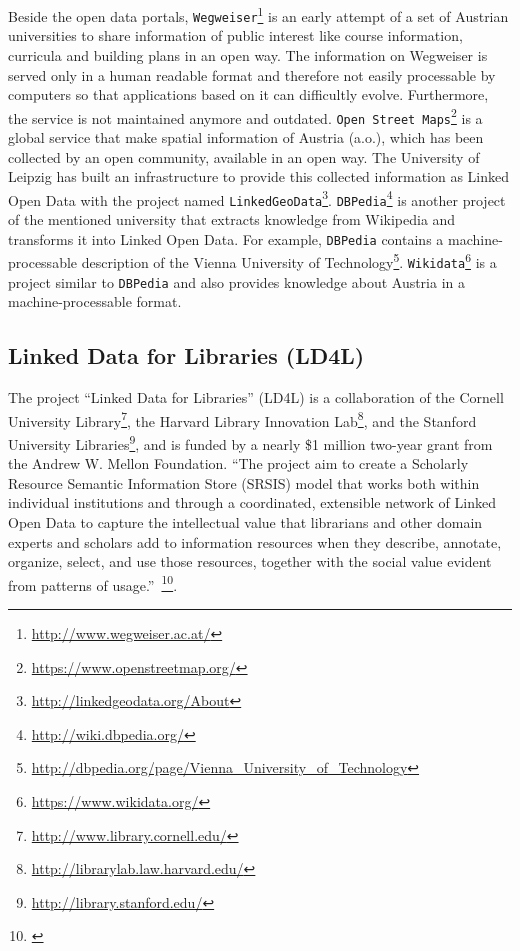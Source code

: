 Beside the open data portals, \texttt{Wegweiser}\footnote{\url{http://www.wegweiser.ac.at/}} is an early attempt of a set of Austrian universities to share information of public interest like course information, curricula and building plans in an open way. The information on Wegweiser is served only in a human readable format and therefore not easily processable by computers so that applications based on it can difficultly evolve. Furthermore, the service is not maintained anymore and outdated. \texttt{Open Street Maps}\footnote{\url{https://www.openstreetmap.org/}} is a global service that make spatial information of Austria (a.o.), which has been collected by an open community, available in an open way. The University of Leipzig has built an infrastructure to provide this collected information as Linked Open Data with the project named \texttt{LinkedGeoData}\footnote{\url{http://linkedgeodata.org/About}}. \texttt{DBPedia}\footnote{\url{http://wiki.dbpedia.org/}} is another project of the mentioned university that extracts knowledge from Wikipedia and transforms it into Linked Open Data. For example, \texttt{DBPedia} contains a machine-processable description of the Vienna University of Technology\footnote{\url{http://dbpedia.org/page/Vienna_University_of_Technology}}. \texttt{Wikidata}\footnote{\url{https://www.wikidata.org/}} is a project similar to \texttt{DBPedia} and also provides knowledge about Austria in a machine-processable format. 

\newpage

\subsection{Linked Data for Libraries (LD4L)\label{ld-libraries}}

The project ``Linked Data for Libraries'' (LD4L) is a collaboration of the Cornell University Library\footnote{\url{http://www.library.cornell.edu/}}, the Harvard Library Innovation Lab\footnote{\url{http://librarylab.law.harvard.edu/}}, and the Stanford University Libraries\footnote{\url{http://library.stanford.edu/}}, and is funded by a nearly \$1 million two-year grant from the Andrew W. Mellon Foundation. ``The project aim to create a Scholarly Resource Semantic Information Store (SRSIS) model that works both within individual institutions and through a coordinated, extensible network of Linked Open Data to capture the intellectual value that librarians and other domain experts and scholars add to information resources when they describe, annotate, organize, select, and use those resources, together with the social value evident from patterns of usage.''~\footnote{\citet{url:ld4l}}.

